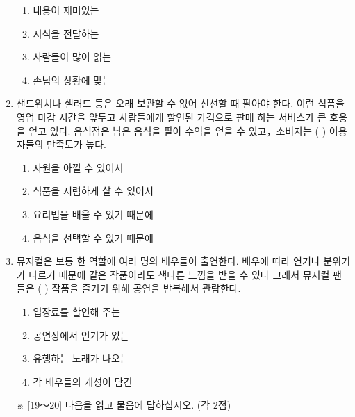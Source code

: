 \documentclass[12pt]{article}
\begin{document}
\begin{enumerate}[1.]
    \begin{enumerate}[1)]
        \item 내용이 재미있는
        \item 지식을 전달하는
        \item 사람들이 많이 읽는
        \item 손님의 상황에 맞는
    \end{enumerate}


    \item

    \begin{mdframed}
    샌드위치나 샐러드 등은 오래 보관할 수 없어 신선할 때 팔아야 한다.
    이런 식품을 영업 마감 시간을 앞두고 사람들에게 할인된 가격으로 판매
    하는 서비스가 큰 호응을 얻고 있다. 음식점은 남은 음식을 팔아 수익을
    얻을 수 있고，소비자는 (     ) 이용자들의 만족도가 높다.

    \end{mdframed}

    \begin{enumerate}[1)]
        \item 자원을 아낄 수 있어서
        \item 식품을 저렴하게 살 수 있어서
        \item 요리법을 배울 수 있기 때문에
        \item 음식을 선택할 수 있기 때문에
    \end{enumerate}


    \item

    \begin{mdframed}
    뮤지컬은 보통 한 역할에 여러 명의 배우들이 출연한다. 배우에 따라
    연기나 분위기가 다르기 때문에 같은 작품이라도 색다른 느낌을 받을 수
    있다 그래서 뮤지컬 팬들은 (      ) 작품을 즐기기 위해 공연을
    반복해서 관람한다.
    \end{mdframed}

    \begin{enumerate}[1)]
        \item 입장료를 할인해 주는
        \item 공연장에서 인기가 있는
        \item 유행하는 노래가 나오는
        \item 각 배우들의 개성이 담긴
    \end{enumerate}



※ [19～20] 다음을 읽고 물음에 답하십시오. (각 2점)


\end{enumerate}
\end{document}
